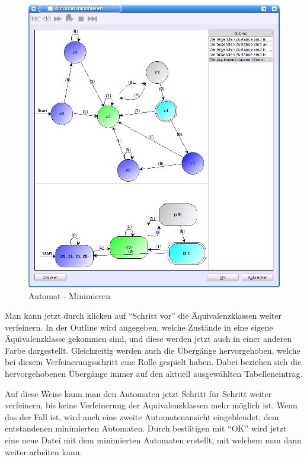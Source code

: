   \begin{figure}[h!]
  \begin{center}
  \includegraphics[width=12cm]{images/minimize.png}
  \caption{Automat - Minimieren}
  \end{center}
  \end{figure}
  
  Man kann jetzt durch klicken auf "`Schritt vor"' die Äquivalenzklassen weiter
  verfeinern. In der Outline wird angegeben, welche Zustände in eine eigene
  Äquivalenzklasse gekommen sind, und diese werden jetzt auch in einer anderen
  Farbe dargestellt. Gleichzeitig werden auch die Übergänge hervorgehoben, welche
  bei diesem Verfeinerungsschritt eine Rolle gespielt haben. Dabei beziehen sich
  die hervorgehobenen Übergänge immer auf den aktuell ausgewählten
  Tabelleneintrag.\vspace{10pt}
  
  Auf diese Weise kann man den Automaten jetzt Schritt für Schritt weiter
  verfeinern, bis keine Verfeinerung der Äquivalenzklassen mehr möglich ist. Wenn
  das der Fall ist, wird auch eine zweite Automatenansicht eingeblendet, dem
  entstandenen minimierten Automaten. Durch bestätigen mit "`OK"' wird jetzt
  eine neue Datei mit dem minimierten Automaten erstellt, mit welchem man dann
  weiter arbeiten kann.\vspace{10pt}
  
